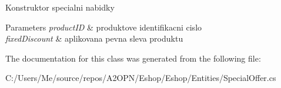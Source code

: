 Konstruktor specialni nabidky 


\begin{DoxyParams}{Parameters}
{\em product\+ID} & produktove identifikacni cislo\\
\hline
{\em fixed\+Discount} & aplikovana pevna sleva produktu\\
\hline
\end{DoxyParams}


The documentation for this class was generated from the following file\+:\begin{DoxyCompactItemize}
\item 
C\+:/\+Users/\+Me/source/repos/\+A2\+O\+P\+N/\+Eshop/\+Eshop/\+Entities/Special\+Offer.\+cs\end{DoxyCompactItemize}
